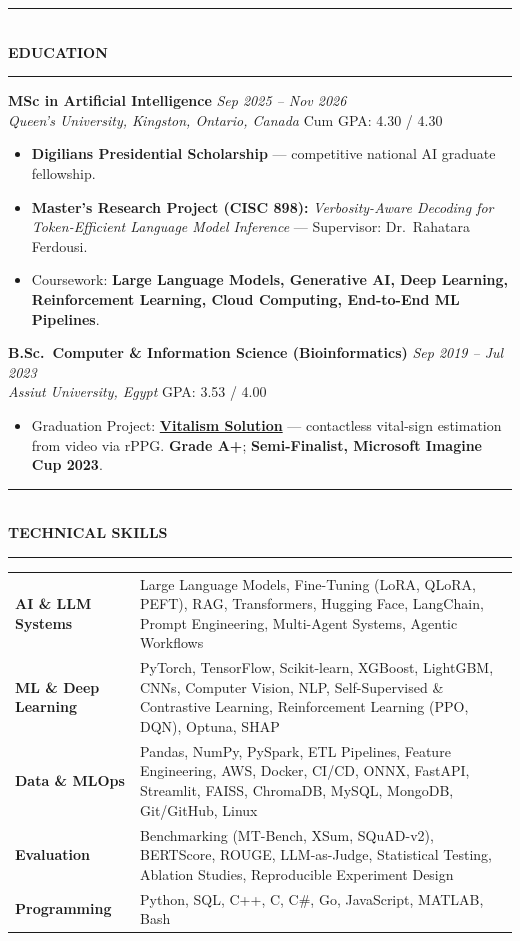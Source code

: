 \documentclass[10pt, a4paper]{article}
\newcommand{\cvsection}[1]{%
  \vspace{3pt}%
  {\color{navy}\rule{\linewidth}{1.1pt}}\\[0.5pt]%
  {\color{navy}\bfseries\fontsize{9.5}{11}\selectfont\uppercase{#1}}\\[-4pt]%
  {\color{teal}\rule{\linewidth}{0.6pt}}%
  \vspace{2pt}%
}
\newcommand{\cventry}[4]{%
  \vspace{2.5pt}%
  \textbf{\color{darkgray}#1} \hfill {\color{midgray}\textit{#3}}\\[-1.5pt]%
  {\color{teal}\textit{#2}} \hfill {\color{midgray}#4}%
}
\newenvironment{cvitems}{%
  \begin{itemize}[leftmargin=11pt, itemsep=0.5pt, parsep=0pt, topsep=1pt,
                  label={\textcolor{teal}{$\bullet$}}]
}{%
  \end{itemize}%
}
\begin{document}
\cvsection{Education}

\cventry{MSc in Artificial Intelligence}{Queen's University, Kingston, Ontario, Canada}
        {Sep 2025 -- Nov 2026}{Cum GPA: 4.30 / 4.30}
\begin{cvitems}
  \item \textbf{Digilians Presidential Scholarship} --- competitive national AI graduate fellowship.
  \item \textbf{Master's Research Project (CISC 898):} \textit{Verbosity-Aware Decoding for Token-Efficient Language Model Inference} --- Supervisor: Dr.\ Rahatara Ferdousi.
  \item Coursework: \textbf{Large Language Models, Generative AI, Deep Learning, Reinforcement Learning, Cloud Computing, End-to-End ML Pipelines}.
\end{cvitems}

\cventry{B.Sc.\ Computer \& Information Science (Bioinformatics)}{Assiut University, Egypt}
        {Sep 2019 -- Jul 2023}{GPA: 3.53 / 4.00}
\begin{cvitems}
  \item Graduation Project: \href{https://vitalismsolution.github.io/}{\textbf{Vitalism Solution}} --- contactless vital-sign estimation from video via rPPG. \textbf{Grade A+}; \textbf{Semi-Finalist, Microsoft Imagine Cup 2023}.
\end{cvitems}

\cvsection{Technical Skills}

\renewcommand{\arraystretch}{1.1}
\begin{tabularx}{\linewidth}{@{}>{\raggedright\hyphenpenalty=10000\arraybackslash}p{35mm} X@{}}
\textbf{AI \& LLM Systems} &
Large Language Models, Fine-Tuning (LoRA, QLoRA, PEFT), RAG, Transformers, Hugging Face, LangChain, Prompt Engineering, Multi-Agent Systems, Agentic Workflows \\

\textbf{ML \& Deep Learning} &
PyTorch, TensorFlow, Scikit-learn, XGBoost, LightGBM, CNNs, Computer Vision, NLP, Self-Supervised \& Contrastive Learning, Reinforcement Learning (PPO, DQN), Optuna, SHAP \\

\textbf{Data \& MLOps} &
Pandas, NumPy, PySpark, ETL Pipelines, Feature Engineering, AWS, Docker, CI/CD, ONNX, FastAPI, Streamlit, FAISS, ChromaDB, MySQL, MongoDB, Git/GitHub, Linux \\

\textbf{Evaluation} &
Benchmarking (MT-Bench, XSum, SQuAD-v2), BERTScore, ROUGE, LLM-as-Judge, Statistical Testing, Ablation Studies, Reproducible Experiment Design \\

\textbf{Programming} &
Python, SQL, C++, C, C\#, Go, JavaScript, MATLAB, Bash \\
\end{tabularx}
\end{document}
